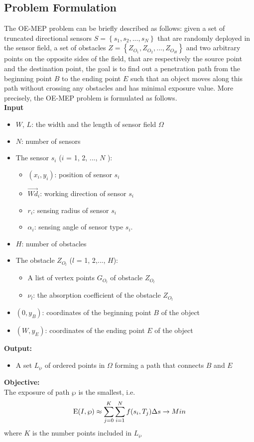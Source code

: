 \documentclass[final]{elsarticle}
\begin{document}
\subsection{Problem Formulation}
The OE-MEP problem can be briefly described as follows: given a set of truncated directional sensors $S = \left\{ {{s_1},{s_2},...,{s_N}} \right\}$ that are randomly deployed in the sensor field, a set of obstacles $Z = \left\{ {{Z_{O_1}},{Z_{O_2}},...,{Z_{O_H}}} \right\}$ and two arbitrary points on the opposite sides of the field, that are respectively the source point and the destination point, the goal is to find out a penetration path from the beginning point $B$ to the ending point $E$ such that an object moves along this path without crossing any obstacles and has minimal exposure value. More precisely, the OE-MEP problem is formulated as follows.\\
\textbf{Input}
\begin{itemize}
		\itemsep-0.2em
		\item $W$, $L$: the width and the length of sensor field $\Omega$
		\item $N$: number of sensors
		\item The sensor $s_i$ ($ i $ = 1, 2, ..., $ N $ ):
		\begin{itemize}
			 \item $({x_i},y_i)$: position of sensor $ s_i $
			 \item $\overrightarrow{Wd}_i$: working direction of sensor $s_i$
			 \item $ r_i $: sensing radius of sensor $ s_i $
			 \item ${\alpha _i}$: sensing angle of sensor type $ s_i $.
		 \end{itemize}
		 \item $H$: number of obstacles
		 \item The obstacle $Z_{O_l}$ ($ l $ = 1, 2,..., $H$): 
		 \begin{itemize}
		 	\item A list of vertex points $ G_{O_l} $ of obstacle $Z_{O_l}$
		 	\item $ \nu_l $: the absorption coefficient of the obstacle $Z_{O_l}$
		 \end{itemize}
		\item $(0, y_B)$: coordinates of the beginning point $B$ of the object
		\item $(W, y_E)$: coordinates of the ending point $E$ of the object
\end{itemize}
\textbf{Output:}
\begin{itemize}
	\item A set ${L_\wp }$ of ordered points in $\Omega $ forming a path that connects $ B $ and $ E $ 
\end{itemize}
\textbf{Objective:}\\
The exposure of path  $\wp $ is the smallest, i.e.
\begin{equation}
\label{eq9}
{\rm E}(I,\wp )  \approx \sum\limits_{j = 0}^K {\sum\limits_{i = 1}^N {f({s_i},{T_j})} } \Delta s  \to Min
\end{equation}
where $ K $ is the number points included in ${L_\wp }$
\end{document}
